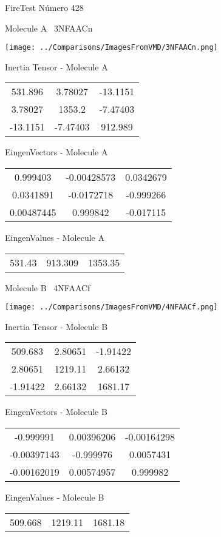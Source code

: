 \vtab[-3cm]
\begin{center}
{\large FireTest \tab Número 428}
\end{center}
\begin{multicols}{2}
\begin{center}

Molecule A \
3NFAACn

\texttt{[image: ../Comparisons/ImagesFromVMD/3NFAACn.png]}

Inertia Tensor - Molecule A \\
\begin{tabular}{|c c c|}
531.896	 & 	3.78027	 & 	-13.1151	 \\
3.78027	 & 	1353.2	 & 	-7.47403	 \\
-13.1151	 & 	-7.47403	 & 	912.989
\end{tabular}

\vtab
 EingenVectors - Molecule A     \\
\begin{tabular}{|c c c|}
0.999403	 & 	-0.00428573	 & 	0.0342679	 \\
0.0341891	 & 	-0.0172718	 & 	-0.999266	 \\
0.00487445	 & 	0.999842	 & 	-0.017115
\end{tabular}

\vtab
 EingenValues - Molecule A     \\
\begin{tabular}{|c c c|}
531.43	 & 	913.309	 & 	1353.35	 \\
\end{tabular}
\columnbreak

Molecule B \
4NFAACf

\texttt{[image: ../Comparisons/ImagesFromVMD/4NFAACf.png]}

Inertia Tensor - Molecule B \\
\begin{tabular}{|c c c|}
509.683	 & 	2.80651	 & 	-1.91422	 \\
2.80651	 & 	1219.11	 & 	2.66132	 \\
-1.91422	 & 	2.66132	 & 	1681.17
\end{tabular}

\vtab
 EingenVectors - Molecule B     \\
\begin{tabular}{|c c c|}
-0.999991	 & 	0.00396206	 & 	-0.00164298	 \\
-0.00397143	 & 	-0.999976	 & 	0.0057431	 \\
-0.00162019	 & 	0.00574957	 & 	0.999982
\end{tabular}

\vtab
 EingenValues - Molecule B     \\
\begin{tabular}{|c c c|}
509.668	 & 	1219.11	 & 	1681.18	 \\
\end{tabular}

\end{center}
\end{multicols}

